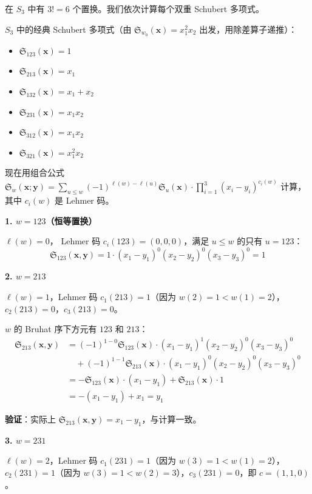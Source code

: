 \begin{Example}[$S_3$ 的计算]
\label{ex:DoubleSchubertS3}
在 $S_3$ 中有 $3! = 6$ 个置换。我们依次计算每个双重 Schubert 多项式。

$S_3$ 中的经典 Schubert 多项式（由 $\mathfrak{S}_{w_0}(\mathbf{x}) = x_1^2 x_2$ 出发，用除差算子递推）：
\begin{itemize}
\item $\mathfrak{S}_{123}(\mathbf{x}) = 1$
\item $\mathfrak{S}_{213}(\mathbf{x}) = x_1$
\item $\mathfrak{S}_{132}(\mathbf{x}) = x_1 + x_2$
\item $\mathfrak{S}_{231}(\mathbf{x}) = x_1 x_2$
\item $\mathfrak{S}_{312}(\mathbf{x}) = x_1 x_2$
\item $\mathfrak{S}_{321}(\mathbf{x}) = x_1^2 x_2$
\end{itemize}

现在用组合公式 $\mathfrak{S}_w(\mathbf{x}; \mathbf{y}) = \sum_{u \leq w} (-1)^{\ell(w)-\ell(u)} \mathfrak{S}_u(\mathbf{x}) \cdot \prod_{i=1}^{3}(x_i - y_i)^{c_i(w)}$ 计算，其中 $c_i(w)$ 是 Lehmer 码。

\textbf{1. $w = 123$（恒等置换）}

$\ell(w) = 0$， Lehmer 码 $c_i(123) = (0,0,0)$，满足 $u \leq w$ 的只有 $u = 123$：
$$\mathfrak{S}_{123}(\mathbf{x},\mathbf{y}) = 1 \cdot (x_1-y_1)^0(x_2-y_2)^0(x_3-y_3)^0 = 1$$

\textbf{2. $w = 213$}

$\ell(w) = 1$，Lehmer 码 $c_1(213) = 1$（因为 $w(2)=1 < w(1)=2$），$c_2(213) = 0$，$c_3(213) = 0$。

$w$ 的 Bruhat 序下方元有 $123$ 和 $213$：
\begin{align*}
\mathfrak{S}_{213}(\mathbf{x},\mathbf{y})
&= (-1)^{1-0} \mathfrak{S}_{123}(\mathbf{x}) \cdot (x_1-y_1)^1(x_2-y_2)^0(x_3-y_3)^0 \\
&\quad + (-1)^{1-1} \mathfrak{S}_{213}(\mathbf{x}) \cdot (x_1-y_1)^0(x_2-y_2)^0(x_3-y_3)^0 \\
&= -\mathfrak{S}_{123}(\mathbf{x}) \cdot (x_1-y_1) + \mathfrak{S}_{213}(\mathbf{x}) \cdot 1 \\
&= -(x_1-y_1) + x_1 = y_1
\end{align*}

\textbf{验证}：实际上 $\mathfrak{S}_{213}(\mathbf{x},\mathbf{y}) = x_1 - y_1$，与计算一致。

\textbf{3. $w = 231$}

$\ell(w) = 2$，Lehmer 码 $c_1(231) = 1$（因为 $w(3)=1 < w(1)=2$），$c_2(231) = 1$（因为 $w(3)=1 < w(2)=3$），$c_3(231) = 0$，即 $c = (1,1,0)$。


\end{Example}
